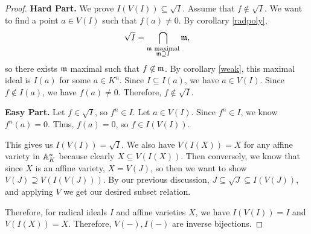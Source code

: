 \documentclass[12pt]{article}
\begin{document}
\begin{proof}
    \textbf{Hard Part.} We prove $I(V(I)) \subseteq \sqrt{I}$. Assume that $f\not\in \sqrt{I}$. We want to find a point $a \in V(I)$ such that $f(a)\neq 0$. By corollary \ref{radpoly}, \[\sqrt{I} = \bigcap_{\substack{\mathfrak{m} \text{ maximal}\\ \mathfrak{m} \supseteq I}} \mathfrak{m},\]
    so there exists $\mathfrak{m}$ maximal such that $f \not\in \mathfrak{m}$. By corollary \ref{weak}, this maximal ideal is $I(a)$ for some $a\in K^n$. Since $I\subseteq I(a)$, we have $a\in V(I)$. Since $f\not\in I(a)$, we have $f(a)\neq 0$. Therefore, $f\not\in \sqrt{I}$.
    
    \textbf{Easy Part.} Let $f\in \sqrt{I}$, so $f^n \in I$. Let $a\in V(I)$. Since $f^n\in I$, we know $f^n(a)=0$. Thus, $f(a)=0$, so $f \in I(V(I))$.
    
    This gives us $I(V(I)) = \sqrt{I}$. We also have $V(I(X))=X$ for any affine variety in $\mathbb{A}_K^n$ because clearly $X\subseteq V(I(X))$. Then conversely, we know that since $X$ is an affine variety, $X=V(J)$, so then we want to show $V(J) \supseteq V(I(V(J)))$. By our previous discussion, $J \subseteq \sqrt{J}\subseteq I(V(J))$, and applying $V$ we get our desired subset relation.
    
    Therefore, for radical ideals $I$ and affine varieties $X$, we have $I(V(I)) = I$ and $V(I(X)) = X$. Therefore, $V(-),I(-)$ are inverse bijections.
\end{proof}
\end{document}
